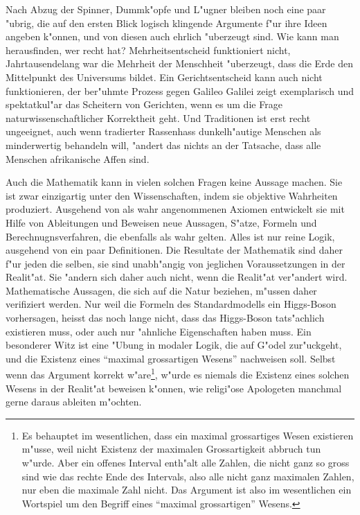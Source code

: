 Nach Abzug der Spinner, Dummk"opfe und L"ugner bleiben noch eine
paar "ubrig, die auf den ersten Blick logisch klingende Argumente
f"ur ihre Ideen angeben k"onnen, und von diesen auch ehrlich 
"uberzeugt sind.
Wie kann man herausfinden, wer recht hat?
Mehrheitsentscheid funktioniert nicht, Jahrtausendelang war
die Mehrheit der Menschheit "uberzeugt, dass die Erde den Mittelpunkt
des Universums bildet.
Ein Gerichtsentscheid kann auch nicht funktionieren, der ber"uhmte
Prozess gegen Galileo Galilei zeigt exemplarisch und spektatkul"ar
das Scheitern von Gerichten, wenn es um die Frage naturwissenschaftlicher
Korrektheit geht.
Und Traditionen ist erst recht ungeeignet, auch wenn tradierter Rassenhass
dunkelh"autige Menschen als minderwertig behandeln will, "andert das
nichts an der Tatsache, dass alle Menschen afrikanische Affen sind.

Auch die Mathematik kann in vielen solchen Fragen keine Aussage machen.
Sie ist zwar einzigartig unter den Wissenschaften, indem
sie objektive Wahrheiten produziert.
Ausgehend von als wahr angenommenen Axiomen entwickelt sie mit 
Hilfe von Ableitungen und Beweisen neue Aussagen, S"atze, Formeln
und Berechnugnsverfahren, die ebenfalls als wahr gelten.
Alles ist nur reine Logik, ausgehend von ein paar Definitionen.
Die Resultate der Mathematik sind daher f"ur jeden die selben, 
sie sind unabh"angig von jeglichen Voraussetzungen in der Realit"at.
Sie "andern sich daher auch nicht, wenn die Realit"at ver"andert wird.
Mathematische Aussagen, die sich auf die Natur beziehen, m"ussen daher
verifiziert werden.
Nur weil die Formeln des Standardmodells ein Higgs-Boson vorhersagen,
heisst das noch lange nicht, dass das Higgs-Boson tats"achlich existieren
muss, oder auch nur "ahnliche Eigenschaften haben muss.
Ein besonderer Witz ist eine "Ubung in modaler Logik, die auf G"odel
zur"uckgeht, und die Existenz eines ``maximal grossartigen Wesens'' 
nachweisen soll. 
Selbst wenn das Argument korrekt w"are\footnote{Es behauptet im wesentlichen,
dass ein maximal grossartiges Wesen existieren m"usse, weil nicht Existenz
der maximalen Grossartigkeit abbruch tun w"urde.
Aber ein offenes Interval enth"alt alle Zahlen, die nicht ganz so gross
sind wie das rechte Ende des Intervals, also alle nicht ganz maximalen
Zahlen, nur eben die maximale Zahl nicht.
Das Argument ist also im wesentlichen ein Wortspiel um den Begriff eines
``maximal grossartigen'' Wesens.}, w"urde es niemals die Existenz eines
solchen Wesens in der Realit"at beweisen k"onnen, wie religi"ose
Apologeten manchmal gerne daraus ableiten m"ochten.

